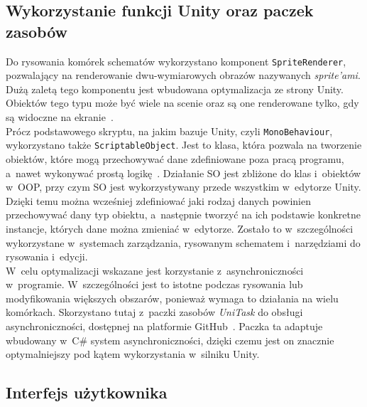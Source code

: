 \subsection{Wykorzystanie funkcji Unity oraz paczek zasobów}
\label{subsec:zasoby}

Do rysowania komórek schematów wykorzystano komponent \texttt{SpriteRenderer},
pozwalający na renderowanie dwu-wymiarowych obrazów nazywanych \textit{sprite'ami}.
Dużą zaletą tego komponentu jest wbudowana optymalizacja ze strony Unity.
Obiektów tego typu może być wiele na scenie oraz są one renderowane tylko,
gdy są widoczne na ekranie~\cite{unity_csharp, unity_docs}. \\
\indent Prócz podstawowego skryptu, na jakim bazuje Unity, czyli \texttt{MonoBehaviour},
wykorzystano także \texttt{ScriptableObject}.
Jest to klasa, która pozwala na tworzenie obiektów, które mogą przechowywać dane zdefiniowane poza pracą programu,
a~nawet wykonywać prostą logikę~\cite{unity_csharp, unity_docs}.
Działanie SO jest zbliżone do klas i~obiektów w~OOP,
przy czym SO jest wykorzystywany przede wszystkim w~edytorze Unity.
Dzięki temu można wcześniej zdefiniować jaki rodzaj danych powinien przechowywać dany typ obiektu,
a~następnie tworzyć na ich podstawie konkretne instancje, których dane można zmieniać w~edytorze.
Zostało to w~szczególności wykorzystane w~systemach zarządzania, rysowanym schematem
i~narzędziami do rysowania i~edycji.\\
\indent W~celu optymalizacji wskazane jest korzystanie z~asynchroniczności w~programie.
W~szczególności jest to istotne podczas rysowania lub modyfikowania większych obszarów,
ponieważ wymaga to działania na wielu komórkach.
Skorzystano tutaj z~paczki zasobów \textit{UniTask} do obsługi asynchroniczności,
dostępnej na platformie GitHub~\cite{unitask}.
Paczka ta adaptuje wbudowany w~C\# system asynchroniczności,
dzięki czemu jest on znacznie optymalniejszy pod kątem wykorzystania w~silniku Unity.


\subsection{Interfejs użytkownika}
\label{subsec:interfejs_uzytkownika}

